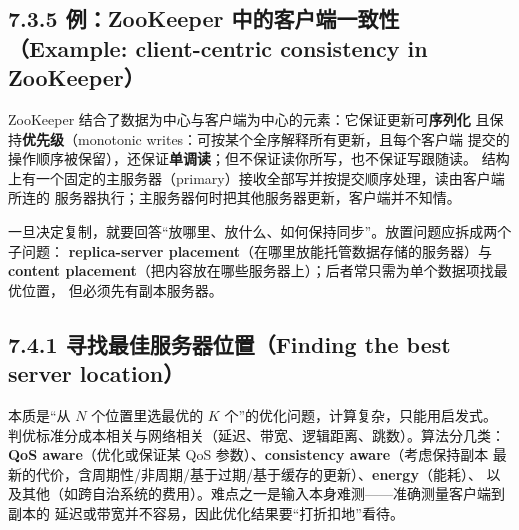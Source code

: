 \begin{closeread}
\end{closeread}


\subsection*{7.3.5 例：ZooKeeper 中的客户端一致性（Example: client-centric consistency in ZooKeeper）}
ZooKeeper 结合了数据为中心与客户端为中心的元素：它保证更新可\textbf{序列化}
且保持\textbf{优先级}（monotonic writes：可按某个全序解释所有更新，且每个客户端
提交的操作顺序被保留），还保证\textbf{单调读}；但不保证读你所写，也不保证写跟随读。
结构上有一个固定的主服务器（primary）接收全部写并按提交顺序处理，读由客户端所连的
服务器执行；主服务器何时把其他服务器更新，客户端并不知情。

\begin{closeread}
\end{closeread}



一旦决定复制，就要回答“放哪里、放什么、如何保持同步”。放置问题应拆成两个子问题：
\textbf{replica-server placement}（在哪里放能托管数据存储的服务器）与
\textbf{content placement}（把内容放在哪些服务器上）；后者常只需为单个数据项找最优位置，
但必须先有副本服务器。

\subsection*{7.4.1 寻找最佳服务器位置（Finding the best server location）}
本质是“从 $N$ 个位置里选最优的 $K$ 个”的优化问题，计算复杂，只能用启发式。
判优标准分成本相关与网络相关（延迟、带宽、逻辑距离、跳数）。算法分几类：
\textbf{QoS aware}（优化或保证某 QoS 参数）、\textbf{consistency aware}（考虑保持副本
最新的代价，含周期性/非周期/基于过期/基于缓存的更新）、\textbf{energy}（能耗）、
以及其他（如跨自治系统的费用）。难点之一是输入本身难测——准确测量客户端到副本的
延迟或带宽并不容易，因此优化结果要“打折扣地”看待。

